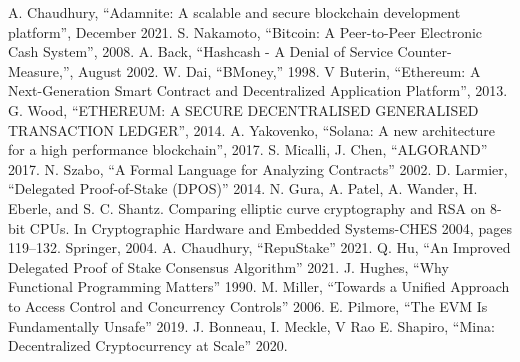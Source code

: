 \documentclass[conference]{IEEEtran}
\begin{document}
\begin{thebibliography}{00}
 A. Chaudhury, ``Adamnite: A scalable and secure
blockchain development platform'', December 2021.
 S. Nakamoto, ``Bitcoin: A Peer-to-Peer Electronic Cash System'', 2008.
 A. Back, ``Hashcash - A Denial of Service Counter-Measure,'', August 2002.
 W. Dai, ``BMoney,'' 1998.
 V Buterin, ``Ethereum: A Next-Generation Smart
Contract and Decentralized Application Platform'',
2013.
 G. Wood, ``ETHEREUM: A SECURE DECENTRALISED GENERALISED TRANSACTION LEDGER'', 2014.
 A. Yakovenko, ``Solana: A new architecture for a high
performance blockchain'', 2017.
 S. Micalli, J. Chen, ``ALGORAND'' 2017.
 N. Szabo, ``A Formal Language for Analyzing Contracts'' 2002.
 D. Larmier, ``Delegated Proof-of-Stake (DPOS)'' 2014.
 N. Gura, A. Patel, A. Wander, H. Eberle,
and S. C. Shantz. Comparing elliptic curve
cryptography and RSA on 8-bit CPUs. In Cryptographic
Hardware and Embedded Systems-CHES 2004, pages
119–132. Springer, 2004.
 A. Chaudhury, ``RepuStake'' 2021.
 Q. Hu, ``An Improved Delegated Proof of Stake Consensus Algorithm'' 2021.
 J. Hughes, ``Why
Functional Programming
Matters'' 1990.
 M. Miller, ``Towards a Unified Approach to Access Control and Concurrency Controls'' 2006.
 E. Pilmore, ``The EVM Is Fundamentally Unsafe'' 2019.
 J. Bonneau, I. Meckle, V Rao
 E. Shapiro, ``Mina: Decentralized Cryptocurrency at Scale'' 2020.




\end{thebibliography}
\end{document}
